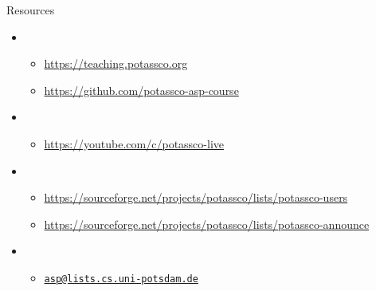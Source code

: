 \begin{frame}{Resources}
  \bigskip
  \begin{itemize}
  \item {}
    \begin{itemize}
    \item \url{https://teaching.potassco.org}
    \item \url{https://github.com/potassco-asp-course}
    \end{itemize}
    \smallskip
  \item {}
    \begin{itemize}
    \item \url{https://youtube.com/c/potassco-live}
    \end{itemize}
    \smallskip
  \item {}
    \begin{itemize}
    \item \scriptsize\url{https://sourceforge.net/projects/potassco/lists/potassco-users}
    \item \scriptsize\url{https://sourceforge.net/projects/potassco/lists/potassco-announce}
    \end{itemize}
    \bigskip
  \item {}
    \begin{itemize}
    \item \href{mailto:asp@lists.cs.uni-potsdam.de}{\texttt{asp@lists.cs.uni-potsdam.de}}
    \end{itemize}
  \end{itemize}
\end{frame}
%
